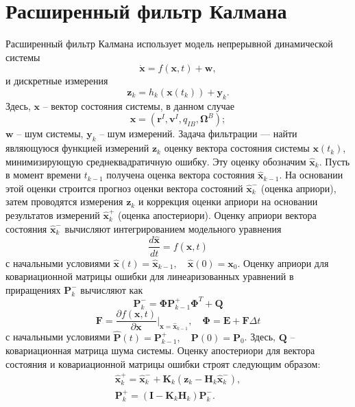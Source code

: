 \section{Расширенный фильтр Калмана}
Расширенный фильтр Калмана использует модель непрерывной динамической системы
\begin{equation} \label{eq:ekf_system}
\dot{\bm{x}} = f(\bm x, t) + \bm w,
\end{equation}
и дискретные измерения
\begin{equation} \label{eq:ekf_mes}
\bm z_k = h_k(\bm x(t_k)) + \bm y_k.
\end{equation}
Здесь, $\bm x$ -- вектор состояния системы, в данном случае
\begin{equation} \label{eq:ekf_state}
\bm x = (\bm r^I, \bm v^I, q_{IB},\bm \Omega^B);
\end{equation}
$\bm w$ -- шум системы, $\bm y_k$ -- шум измерений.
Задача фильтрации — найти являющуюся функцией измерений
$\bm z_k$
оценку вектора состояния системы
$\bm x(t_k)$,
минимизирующую среднеквадратичную ошибку.
Эту оценку обозначим $\hat{\bm{x}}_k$.
Пусть в момент времени $t_{k-1}$ получена оценка вектора состояния
$\hat{\bm{x}}_{k-1}$.
На основании этой оценки строится прогноз оценки вектора состояний
$\hat{\bm{x}}_k^-$
(оценка априори), затем проводятся измерения
$\bm z_k$
и коррекция оценки априори на основании результатов измерений
$\hat{\bm{x}}_k^+$
(оценка апостериори). Оценку априори вектора состояния
$\hat{\bm{x}}_k^-$ вычисляют интегрированием модельного уравнения
\begin{equation}
\frac{d\hat{\bm{x}}}{dt} = f(\hat{\bm{x}}, t)
\end{equation}
с начальными условиями
$\hat{\bm{x}}(t) = \hat{\bm{x}}_{k-1}, \quad \hat{\bm{x}}(0) = \bm x_0$.
Оценку априори для ковариационной матрицы ошибки для линеаризованных уравнений в приращениях
$\bm P_k^-$
вычисляют как
\begin{equation}
\bm P_k^- = \bm \Phi \bm P_{k-1}^+ \bm \Phi^{T} + \bm Q
\end{equation}
\begin{equation}
\bm F = \frac{\partial f(\bm x, t)}{\partial \bm x} \Bigg|_{\bm{x} = \hat{\bm{x}}_{k-1}}
, \quad
\bm \Phi = \bm E + \bm F \Delta t
\end{equation}
с начальными условиями
$\hat{\bm{P}}(t) = \bm{P}_{k-1}^+, \quad \bm{P}(0) = \bm P_0$.
Здесь, $\bm Q$ -- ковариационная матрица шума системы. Оценку апостериори для вектора состояния и ковариационной матрицы ошибки строят следующим образом:
\begin{equation}
\begin{array}{l}
{\bm{\hat x}}_k^ +  = {\bm{\hat x}}_k^ -  + {{\bm{K}}_k}({{\bm{z}}_k} - {{\bm{H}}_k}{\bm{\hat x}}_k^ - ),\\
{\bm{P}}_k^ +  = \left( {{\bm{I}} - {{\bm{K}}_k}{{\bm{H}}_k}} \right){\bm{P}}_k^ - .
\end{array}
\end{equation}

